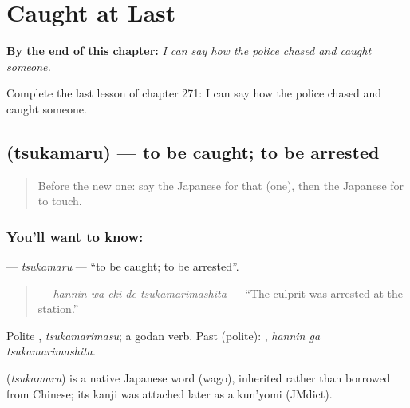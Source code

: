 
\chapter{Caught at Last}
\label{ch:ja-caught-at-last}

\begin{chapteropening}
\textbf{By the end of this chapter:} \emph{I can say how the police chased and caught someone.}

Complete the last lesson of chapter 271: I can say how the police chased and caught someone.
\end{chapteropening}

\section[\texorpdfstring{\ja{つかまる} (tsukamaru)}{つかまる (tsukamaru)}]{ (tsukamaru) — to be caught; to be arrested}

\label{lesson:JA-C271-tsukamaru}



\begin{quote}
Before the new one: say the Japanese for that (one), then the Japanese for to touch.
\end{quote}

\subsection*{You'll want to know: }
\textbf{} — \emph{tsukamaru} — \textquotedblleft{}to be caught; to be arrested\textquotedblright{}.

\begin{quote}
\textbf{  } — \emph{hannin wa eki de tsukamarimashita} — \textquotedblleft{}The culprit was arrested at the station.\textquotedblright{}
\end{quote}

Polite \textbf{}, \emph{tsukamarimasu}; a godan verb. Past (polite): \textbf{ }, \emph{hannin ga tsukamarimashita}.

\begin{cousinweb}
\textbf{} (\emph{tsukamaru}) is a native Japanese word (wago), inherited rather than borrowed from Chinese; its kanji was attached later as a kun'yomi (JMdict).
\end{cousinweb}

